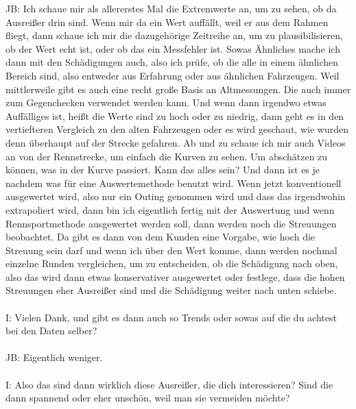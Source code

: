 \begin{linenumbers}
JB: Ich schaue mir als allererstes Mal die Extremwerte an, um zu sehen, ob da Ausreißer drin sind. Wenn mir da ein Wert auffällt, weil er aus dem Rahmen fliegt, dann schaue ich mir die dazugehörige Zeitreihe an, um zu plausibilisieren, ob der Wert echt ist, oder ob das ein Messfehler ist. Sowas Ähnliches mache ich dann mit den Schädigungen auch, also ich prüfe, ob die alle in einem ähnlichen Bereich sind, also entweder aus Erfahrung oder aus ähnlichen Fahrzeugen. Weil mittlerweile gibt es auch eine recht große Basis an Altmessungen. Die auch immer zum Gegenchecken verwendet werden kann. Und wenn dann irgendwo etwas Auffälliges ist, heißt die Werte sind zu hoch oder zu niedrig, dann geht es in den vertiefteren Vergleich zu den alten Fahrzeugen oder es wird geschaut, wie wurden denn überhaupt auf der Strecke gefahren. Ab und zu schaue ich mir auch Videos an von der Rennstrecke, um einfach die Kurven zu sehen. Um abschätzen zu können, was in der Kurve passiert. Kann das alles sein? Und dann ist es je nachdem was für eine Auswertemethode benutzt wird. Wenn jetzt konventionell ausgewertet wird, also nur ein Outing genommen wird und dass das irgendwohin extrapoliert wird, dann bin ich eigentlich fertig mit der Auswertung und wenn Rennsportmethode ausgewertet werden soll, dann werden noch die Streuungen beobachtet. Da gibt es dann von dem Kunden eine Vorgabe, wie hoch die Streuung sein darf und wenn ich über den Wert komme, dann werden nochmal einzelne Runden vergleichen, um zu entscheiden, ob die Schädigung nach oben, also das wird dann etwas konservativer ausgewertet oder festlege, dass die hohen Streuungen eher Ausreißer sind und die Schädigung weiter nach unten schiebe. \\\\
I: Vielen Dank, und gibt es dann auch so Trends oder sowas auf die du achtest bei den Daten selber?\\\\
JB: Eigentlich weniger.\\\\
I: Also das sind dann wirklich diese Ausreißer, die dich interessieren? Sind die dann spannend oder eher unschön, weil man sie vermeiden möchte?\\\\

\end{linenumbers}
